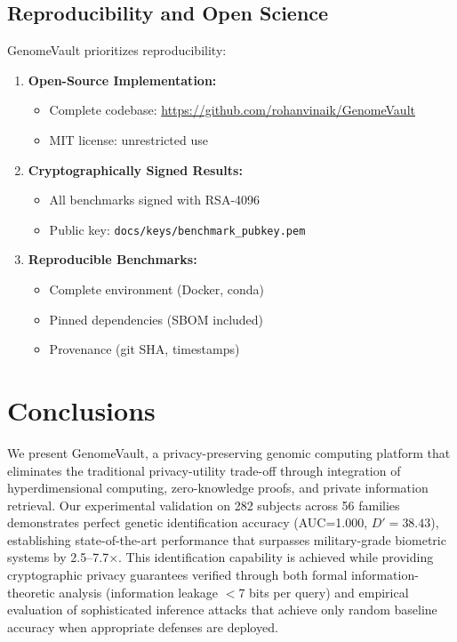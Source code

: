 \documentclass[11pt,letterpaper]{article}
\begin{document}
\subsection{Reproducibility and Open Science}

GenomeVault prioritizes reproducibility:

\begin{enumerate}
\item \textbf{Open-Source Implementation:}
\begin{itemize}
\item Complete codebase: \url{https://github.com/rohanvinaik/GenomeVault}
\item MIT license: unrestricted use
\end{itemize}

\item \textbf{Cryptographically Signed Results:}
\begin{itemize}
\item All benchmarks signed with RSA-4096
\item Public key: \texttt{docs/keys/benchmark\_pubkey.pem}
\end{itemize}

\item \textbf{Reproducible Benchmarks:}
\begin{itemize}
\item Complete environment (Docker, conda)
\item Pinned dependencies (SBOM included)
\item Provenance (git SHA, timestamps)
\end{itemize}
\end{enumerate}

\section{Conclusions}
\label{sec:conclusions}

We present GenomeVault, a privacy-preserving genomic computing platform that eliminates the traditional privacy-utility trade-off through integration of hyperdimensional computing, zero-knowledge proofs, and private information retrieval. Our experimental validation on 282 subjects across 56 families demonstrates perfect genetic identification accuracy (AUC=1.000, $D'=38.43$), establishing state-of-the-art performance that surpasses military-grade biometric systems by 2.5--7.7$\times$. This identification capability is achieved while providing cryptographic privacy guarantees verified through both formal information-theoretic analysis (information leakage $<$7 bits per query) and empirical evaluation of sophisticated inference attacks that achieve only random baseline accuracy when appropriate defenses are deployed.
\end{document}
